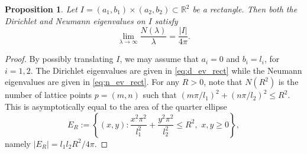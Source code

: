 \documentclass{amsart}
\newtheorem{proposition}[theorem]{Proposition}
\theoremstyle{definition}
\begin{document}
\begin{proposition} \label{prop:Weyl_rectangles}
    Let $I = (a_1, b_1) \times (a_2, b_2) \subset \mathbb{R}^2$ be a rectangle. Then both the Dirichlet and Neumann eigenvalues on $I$ satisfy 
    \begin{equation*}
        \lim_{\lambda \to \infty} \frac{N(\lambda)}{\lambda} = \frac{|I|}{4\pi}.
    \end{equation*}
\end{proposition}
\begin{proof}
By possibly translating $I$, we may assume that $a_i = 0$ and $b_i = l_i$, for $i = 1, 2$.  The Dirichlet eigenvalues are given in \eqref{eq:d_ev_rect} while the Neumann eigenvalues are given in \eqref{eq:n_ev_rect}.  For any $R > 0$, note that $N(R^2)$ is the number of lattice points $p = (m, n)$ such that $(m\pi/l_1)^2 + (n\pi/l_2)^2 \leq R^2$. This is asymptotically equal to the area of the quarter ellipse
    \begin{equation*}
        E_R := \left\{(x,y) : \frac{x^2\pi^2}{l_1^2} + \frac{y^2\pi^2}{l_2^2} \leq R^2, \,\, x,y \geq 0 \right\},
    \end{equation*}
    namely $|E_R| = l_1l_2R^2/4\pi$. 
   


\end{proof}
\end{document}
